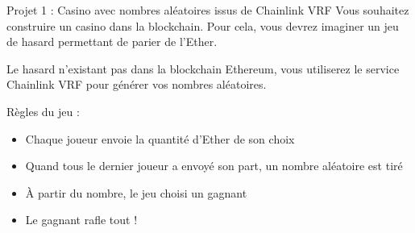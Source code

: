 \begin{frame}{Projet 1 : Casino avec nombres aléatoires issus de Chainlink VRF}
  Vous souhaitez construire un casino dans la blockchain.
  Pour cela, vous devrez imaginer un jeu de hasard permettant de parier de l'Ether.

  Le hasard n'existant pas dans la blockchain Ethereum, vous utiliserez le service Chainlink VRF pour générer vos nombres aléatoires.

  Règles du jeu  :

  \begin{itemize}
    \item Chaque joueur envoie la quantité d'Ether de son choix
    \item Quand tous le dernier joueur a envoyé son part, un nombre aléatoire est tiré
    \item À partir du nombre, le jeu choisi un gagnant
    \item Le gagnant rafle tout !
  \end{itemize}
\end{frame}